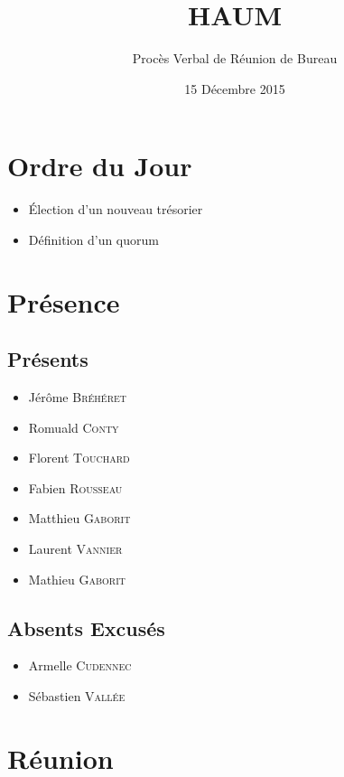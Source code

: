 \documentclass[a4paper, 11pt]{article}
\title{HAUM}
\author{Procès Verbal de Réunion de Bureau}
\date{15 Décembre 2015}
\begin{document}
	\maketitle

	\section{Ordre du Jour}

	\begin{itemize}
		\item Élection d'un nouveau trésorier
		\item Définition d'un quorum
	\end{itemize}

	\section{Présence}

	\subsection{Présents}

	\begin{itemize}
		\item Jérôme \textsc{Bréhéret}
		\item Romuald \textsc{Conty}
		\item Florent \textsc{Touchard}
		\item Fabien \textsc{Rousseau}
		\item Matthieu \textsc{Gaborit}
		\item Laurent \textsc{Vannier}
		\item Mathieu \textsc{Gaborit}
	\end{itemize}

	\subsection{Absents Excusés}

	\begin{itemize}
		\item Armelle \textsc{Cudennec}
		\item Sébastien \textsc{Vallée}
	\end{itemize}

	\section{Réunion}
\end{document}
